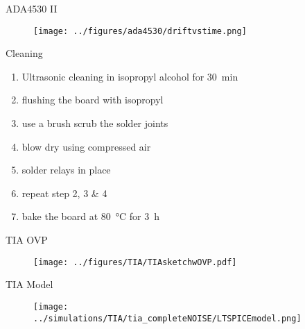\documentclass[t]{beamer}
\begin{document}
\begin{frame}[c,noframenumbering]{ADA4530 II}
	\begin{figure}
		\texttt{[image: ../figures/ada4530/driftvstime.png]}
	\end{figure}
\end{frame}

\begin{frame}[c,noframenumbering]{Cleaning}
	\begin{enumerate}
		\item Ultrasonic cleaning in isopropyl alcohol for \SI{30}{\minute}
		\item flushing the board with isopropyl 
		\item use a brush scrub the solder joints 
		\item blow dry using compressed air
		\item solder relays in place
		\item repeat step 2, 3 \& 4
		\item bake the board at \SI{80}{\degreeCelsius} for \SI{3}{\hour}
	\end{enumerate}
\end{frame}

\begin{frame}[c,noframenumbering]{TIA OVP}
	\begin{figure}
		\centering
		\texttt{[image: ../figures/TIA/TIAsketchwOVP.pdf]}
	\end{figure}
\end{frame}

\begin{frame}[c,noframenumbering]{TIA Model}
	\begin{figure}
		\centering
		\texttt{[image: ../simulations/TIA/tia\_completeNOISE/LTSPICEmodel.png]}
		\label{fig:tia:ltspicemodel}
	\end{figure}
\end{frame}
\end{document}
